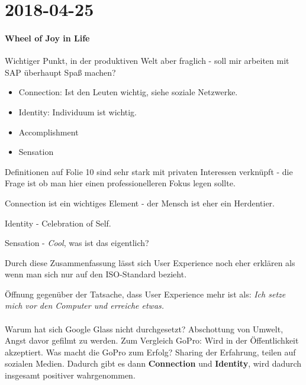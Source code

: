 \section{2018-04-25}
\paragraph{Wheel of Joy in Life}

Wichtiger Punkt, in der produktiven Welt aber fraglich - soll mir arbeiten mit 
SAP überhaupt Spaß machen?

\begin{itemize}
\item Connection: Ist den Leuten wichtig, siehe soziale Netzwerke.
\item Identity: Individuum  ist wichtig.
\item Accomplishment
\item Sensation
\end{itemize}

Definitionen auf Folie 10 sind sehr stark mit privaten Interessen verknüpft -
die Frage ist ob man hier einen professionelleren Fokus legen sollte.

Connection ist ein wichtiges Element - der Mensch ist eher ein Herdentier.

Identity - Celebration of Self. 

Sensation - \textit{Cool}, was ist das eigentlich?

Durch diese Zusammenfassung lässt sich User Experience noch eher erklären als 
wenn man sich nur auf den ISO-Standard bezieht.

Öffnung gegenüber der Tatsache, dass User Experience mehr ist als: \textit{Ich setze mich vor
den Computer und erreiche etwas.}
\\
\noindent{}
\\
Warum hat sich Google Glass nicht durchgesetzt? Abschottung von Umwelt, Angst davor
gefilmt zu werden. 
Zum Vergleich GoPro: Wird in der Öffentlichkeit akzeptiert. 
Was macht die GoPro zum Erfolg? Sharing der Erfahrung, teilen auf sozialen Medien.
Dadurch gibt es dann \textbf{Connection} und \textbf{Identity}, wird dadurch 
insgesamt positiver wahrgenommen.

